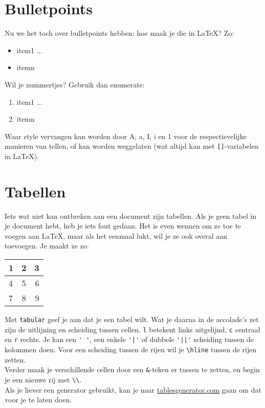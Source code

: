 \documentclass[a4paper,10pt]{article}
\begin{document}
\section{Bulletpoints}
Nu we het toch over bulletpoints hebben: hoe maak je die in \LaTeX? Zo:

\begin{verbbox}
\begin{itemize}
\item item1 ... 
\item itemn
\end{itemize}
\end{verbbox}
\theverbbox

Wil je nummertjes? Gebruik dan enumerate:

\begin{verbbox}
\begin{enumerate}[style]
\item item1 ... 
\item itemn
\end{enumerate}
\end{verbbox}
\theverbbox

Waar style vervangen kan worden door A, a, I, i en 1 voor de respectievelijke manieren van tellen, of kan worden weggelaten (wat altijd kan met \verb|[]|-variabelen in \LaTeX).

\section{Tabellen}
Iets wat niet kan ontbreken aan een document zijn tabellen. Als je geen tabel in je document hebt, heb je iets fout gedaan. Het is even wennen om ze toe te voegen aan \LaTeX, maar als het eenmaal lukt, wil je ze ook overal aan toevoegen. Je maakt ze zo:

\begin{verbbox}
\begin{tabular}{ l || c r }
  1 & 2 & 3 \\
  \hline
  4 & 5 & 6 \\
  7 & 8 & 9 \\
\end{tabular}
\end{verbbox}
\theverbbox

Met \verb|tabular| geef je aan dat je een tabel wilt. Wat je daarna in de accolade's zet zijn de uitlijning en scheiding tussen cellen. \verb|l| betekent links uitgelijnd, \verb|c| centraal en \verb|r| rechts. Je kan een \verb|' '|, een enkele \verb+'|'+ of dubbele \verb+'||'+ scheiding tussen de kolommen doen. Voor een scheiding tussen de rijen wil je \verb|\hline| tussen de rijen zetten.\\
Verder maak je verschillende cellen door een \verb|&|-teken er tussen te zetten, en begin je een nieuwe rij met \verb|\\|.\\
Als je liever een generator gebruikt, kan je naar \href{http://www.tablesgenerator.com/}{tablesgenerator.com} gaan om dat voor je te laten doen.
\end{document}
